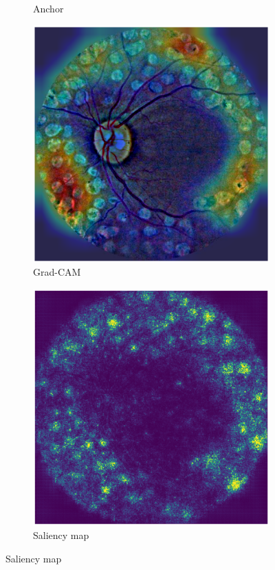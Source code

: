 \begin{figure}[htb]
\begin{subfigure}[b]{0.24\textwidth}
         \caption{Anchor}
         \label{fig:anchor}
    \end{subfigure}
    \hfill
    \begin{subfigure}[b]{0.24\textwidth}
         \centering
         \includegraphics[width=\textwidth,height=\textwidth]{figures/chapter6/others/grad_cam4.png}
         \caption{Grad-CAM}
    \end{subfigure}
    \hfill
    \begin{subfigure}[b]{0.24\textwidth}
         \centering
         \includegraphics[width=\textwidth,height=\textwidth]{figures/chapter6/others/saliency.png}
         \caption{Saliency map}
     \end{subfigure}


\end{figure}
